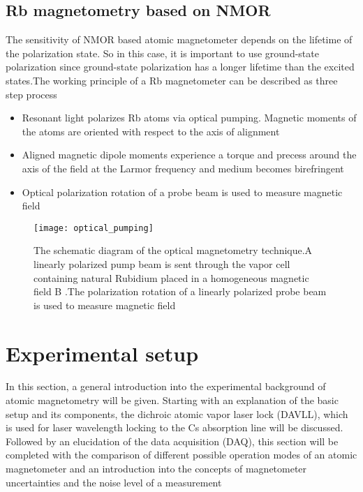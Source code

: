 \documentclass[12pt]{report}
\begin{document}
\section{Rb magnetometry based on NMOR}

The sensitivity of NMOR based atomic magnetometer depends on the lifetime of the polarization state. So in this case, it is important to use ground-state polarization since ground-state polarization has a longer lifetime than the excited states.The working principle of a Rb magnetometer can be described as three step process
\begin{itemize}
\item
Resonant  light polarizes Rb atoms via optical pumping. Magnetic moments of the atoms are oriented with respect to the axis of alignment
\end{itemize}
\begin{itemize}
\item Aligned magnetic dipole moments experience a torque and precess around the axis of the field at the Larmor frequency and medium becomes birefringent
\end{itemize}
\begin{itemize}
\item Optical polarization rotation of a probe beam is used to measure magnetic field
\end{itemize}
\begin{figure}[h]
\centering
\texttt{[image: optical\_pumping]}
\caption{The schematic diagram of the optical magnetometry technique.A linearly polarized pump beam is sent through the vapor cell containing natural Rubidium placed in a homogeneous magnetic field B .The polarization rotation of a linearly polarized probe beam is used to measure magnetic field}
\end{figure}
\chapter{Experimental setup}
\small

In this section, a general introduction into the experimental background of atomic magnetometry will be given. Starting with an explanation of the basic setup and its components, the dichroic atomic vapor laser lock (DAVLL), which is used for laser wavelength locking to the Cs absorption line will be discussed. Followed by an elucidation of the data acquisition (DAQ), this section will be completed with the comparison of different possible operation modes of an atomic magnetometer and an introduction into the concepts of magnetometer uncertainties and the noise level of a measurement
\end{document}

